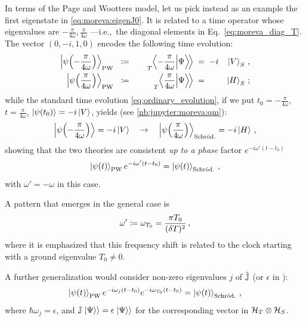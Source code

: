In terms of the Page and Wootters model,
let us pick instead as an example the first eigenstate in \eqref{eq:moreva:eigenJ0}.
It is related to a time operator whose eigenvalues are
$-\frac{\pi}{4\omega}, \frac{\pi}{4\omega}$
---i.e.,~the diagonal elements in Eq.~\eqref{eq:moreva_diag_T}.
The vector $(0, -i, 1, 0)$ encodes
the following time evolution:
\begin{alignat}{4}
  \ket{\psi\qty(-\frac{\pi}{4\omega})}_{\mathrm{PW}}&{} \:\:\, \coloneqq&{\quad} \prescript{}{T}{\!\left.\left\langle -\frac{\pi}{4\omega} \middle| \Psi \right\rangle\!\right\rangle}&{\;} =\; -i&\ket{V}_S
  \, \text{,}
  \\
  \ket{\psi\qty( \frac{\pi}{4\omega})}_{\mathrm{PW}}&{} \:\:\, \coloneqq&{\quad} \prescript{}{T}{\!\left.\left\langle \frac{\pi}{4\omega} \middle| \Psi \right\rangle\!\right\rangle} &{\;} =\;   &\ket{H}_S
  \, \text{;}
\end{alignat}
while the standard time evolution \eqref{eq:ordinary_evolution}, if we put
$t_0 = -\frac{\pi}{4\omega}$, $t = \frac{\pi}{4\omega}$, $\ket{\psi\qty(t_0)} = -i\ket{V}$,
yields (see \ref{nb:jupyter:moreva:qm}):
\begin{equation}
  \ket{\psi\qty(-\frac{\pi}{4\omega})} = -i\ket{V}
  \quad \rightarrow \quad
  \ket{\psi\qty( \frac{\pi}{4\omega})}_{\mathrm{Schr\ddot{o}d.}} = -i\ket{H}
  \, \text{,}
\end{equation}
showing that the two theories are consistent \emph{up to a phase} factor
$e^{-i\omega'(t - t_{0})}$
\begin{equation}
  \ket{\psi(t)}_{\mathrm{PW}} e^{-i\omega'(t - t_{0})} = \ket{\psi(t)}_{\mathrm{Schr\ddot{o}d.}} \,\text{,}
\end{equation}
with $\omega' = -\omega$ in this case.

A pattern that emerges in the general case is
\[
  \omega' \coloneqq \omega_{T_{0}} = \frac{\pi T_0}{(\delta T)^2} \,\text{,}
\]
where it is emphasized that this frequency shift is related to the clock starting
with a ground eigenvalue $T_0 \ne 0$.

A further generalization would consider non-zero eigenvalues $j$ of $\hat{\mathbb{J}}$
(or $\epsilon$ in \cite[eq. 16]{Lloyd:Time}):
\begin{equation}\label{eq:pw-vs-qm}
  \ket{\psi(t)}_{\mathrm{PW}} e^{-i\omega_{j}(t - t_{0})} e^{-i\omega_{T_0}(t - t_{0})} = \ket{\psi(t)}_{\mathrm{Schr\ddot{o}d.}} \,\text{,}
\end{equation}
where $\hbar\omega_j = \epsilon$,
and $\mathbb{J}\left.\left| \Psi \right\rangle\right\rangle = \epsilon \left.\left| \Psi \right\rangle\right\rangle$
for the corresponding vector in $\mathcal{H}_T \otimes \mathcal{H}_S$.

